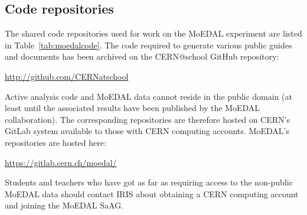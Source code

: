 \clearpage

\subsection{Code repositories}
\label{sec:moedalcode}
The shared code repositories used for work on the \acs{MoEDAL} experiment
are listed in Table~\ref{tab:moedalcode}.
The code required to generate various public guides and documents 
has been archived on the CERN@school GitHub repository:

\href{http://github.com/CERNatschool}{http://github.com/CERNatschool}

Active analysis code and MoEDAL data cannot reside in the public domain
(at least until the associated results have been published by the
\acs{MoEDAL} collaboration). The corresponding repositories are therefore
hosted on \acs{CERN}'s GitLab system available to those with \acs{CERN}
computing accounts. \acs{MoEDAL}'s repositories are hosted here:

\href{https://gitlab.cern.ch/moedal/}{https://gitlab.cern.ch/moedal/}

Students and teachers who have got as far as requiring access to the
non-public MoEDAL data should contact \acs{IRIS} about obtaining a
\acs{CERN} computing account and joining the \acs{MoEDAL}
\acl{SaAG}.





\clearpage
